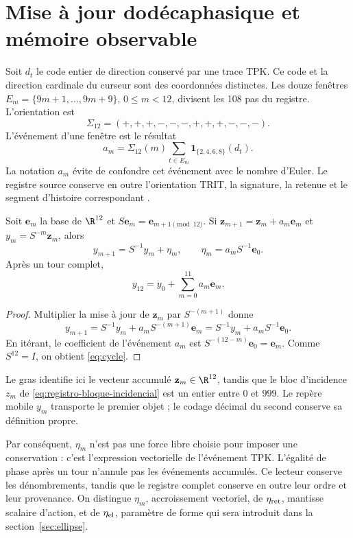 \section{Mise à jour dodécaphasique et mémoire observable}
\label{sec:eta}
Soit $d_t$ le code entier de direction conservé par une trace TPK. Ce code et la direction cardinale du curseur sont des coordonnées distinctes. Les douze fenêtres $E_m=\{9m+1,\ldots,9m+9\}$, $0\le m<12$, divisent les 108 pas du registre. L'orientation est
\[
\Sigma_{12}=(+,+,+,-,-,-,+,+,+,-,-,-).
\]
L'événement d'une fenêtre est le résultat
\begin{equation}
a_m=\Sigma_{12}(m)
\sum_{t\in E_m}\mathbf1_{\{2,4,6,8\}}(d_t).
\label{eq:events}
\end{equation}
La notation $a_m$ évite de confondre cet événement avec le nombre d’Euler.
Le registre source conserve en outre l’orientation TRIT, la signature,
la retenue et le segment d’histoire correspondant \cite{registro}.

\begin{proposition}
Soit $\mathbf e_m$ la base de $\R^{12}$ et
$S\mathbf e_m=\mathbf e_{m+1\pmod{12}}$. Si
$\mathbf z_{m+1}=\mathbf z_m+a_m\mathbf e_m$ et $y_m=S^{-m}\mathbf z_m$, alors
\begin{equation}
y_{m+1}=S^{-1}y_m+\eta_m,
\qquad
\eta_m=a_mS^{-1}\mathbf e_0.
\label{eq:eta}
\end{equation}
Après un tour complet,
\begin{equation}
y_{12}=y_0+\sum_{m=0}^{11}a_m\mathbf e_m.
\label{eq:cycle}
\end{equation}
\end{proposition}
\begin{proof}
Multiplier la mise à jour de $\mathbf z_m$ par $S^{-(m+1)}$ donne
\[
y_{m+1}=S^{-1}y_m+a_mS^{-(m+1)}\mathbf e_m
=S^{-1}y_m+a_mS^{-1}\mathbf e_0.
\]
En itérant, le coefficient de l’événement $a_m$ est
$S^{-(12-m)}\mathbf e_0=\mathbf e_m$. Comme $S^{12}=I$,
on obtient \eqref{eq:cycle}.
\end{proof}

Le gras identifie ici le vecteur accumulé
\(\mathbf z_m\in\R^{12}\), tandis que le bloc d’incidence
\(z_m\) de \eqref{eq:registro-bloque-incidencial} est un entier entre
\(0\) et \(999\). Le repère mobile \(y_m\) transporte le premier objet ;
le codage décimal du second conserve sa définition propre.

Par conséquent, $\eta_m$ n’est pas une force libre choisie pour imposer une
conservation : c’est l’expression vectorielle de l’événement TPK. L’égalité de phase
après un tour n’annule pas les événements accumulés. Ce lecteur
conserve les dénombrements, tandis que le registre complet conserve en outre leur
ordre et leur provenance. On distingue $\eta_m$, accroissement vectoriel, de
$\eta_{\rm ret}$, mantisse scalaire d’action, et de $\eta_{\rm el}$,
paramètre de forme qui sera introduit dans la section~\ref{sec:ellipse}.

